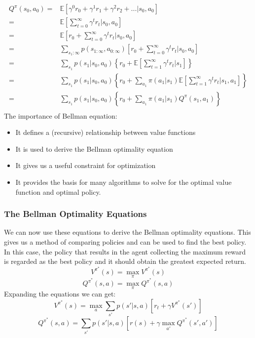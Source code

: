 \documentclass[11pt]{article}
\begin{document}
\begin{equation}
\begin{split}
Q^{\pi}(s_0,a_0) = & \mathbb{E} \left[\gamma^0 r_0 + \gamma^1 r_1+\gamma^2 r_2+...\bigg|s_0,a_0\right]\nonumber\\    
= & \mathbb{E}\left[\sum_{t=0}^{\infty} \gamma^t r_t\bigg|s_0,a_0\right]\\
= & \mathbb{E}\left[r_0+\sum_{t=0}^{\infty} \gamma^t r_t\bigg|s_0,a_0\right]\\
= & \sum_{s_1:\infty} p(s_{1:\infty},a_{0:\infty}) \left[r_0+\sum_{t=0}^{\infty} \gamma^t r_t\bigg|s_0,a_0\right]\\
= &  \sum_{s_1}p(s_1|s_{0},a_{0}) \left\{r_0+ \mathbb{E} \left[\sum_{t=1}^{\infty} \gamma^t r_t\bigg|s_1\right]\right\}\\
= &  \sum_{s_1}p(s_1|s_{0},a_{0}) \left\{r_0+ \sum_{a_1} \pi(a_1|s_1)\mathbb{E} \left[\sum_{t=1}^{\infty} \gamma^t r_t\bigg|s_1,a_1\right]\right\}\\
= &  \sum_{s_1} p(s_1|s_{0},a_{0}) \left\{r_0+ \sum_{a_1} \pi(a_1|s_1) Q^{\pi} (s_1,a_1)\right\}\\
\end{split}
\end{equation}
The importance of Bellman equation:
\vspace{-5mm}
\begin{itemize}\itemsep -2pt
\item It defines a (recursive) relationship between value functions
\item It is used to derive the Bellman optimality equation
\item It gives us a useful constraint for optimization
\item It provides the basis for many algorithms to solve for the optimal value function and optimal policy.
\end{itemize}

\subsubsection{The Bellman Optimality Equations}
We can now use these equations to derive the Bellman optimality equations. This gives us a method of comparing policies and can be used to find the best policy. In this case, the policy that results in the agent collecting the maximum reward is regarded as the best policy and it should obtain the greatest expected return.
$$V^{\pi^*}(s) = \max_{\pi} V^{\pi^*}(s)$$
$$Q^{\pi^*}(s,a) = \max_{\pi} Q^{\pi^*}(s,a)$$
Expanding the equations we can get:
$$V^{\pi^*}(s) = \max_{a} \sum_{s'} p(s'|s,a) [r_t + \gamma V^{\pi^*}(s')]$$
$$Q^{\pi^*}(s,a) = \sum_{s'} p(s'|s,a) [r(s)+\gamma \max_{a'} Q^{\pi^*}(s',a')]$$
\end{document}
